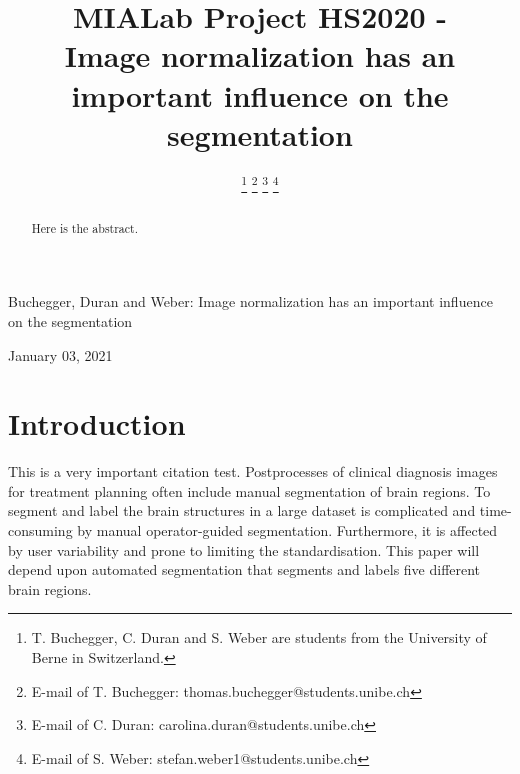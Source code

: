 \documentclass[journal]{IEEEtran}
\begin{document}


\title{MIALab Project HS2020 - \\ Image normalization has an important influence on the segmentation}

\author{ 
\and {} 
\and {} 
\thanks{T. Buchegger, C. Duran and S. Weber are students from the University of Berne in Switzerland.}%
\thanks{E-mail of T. Buchegger: thomas.buchegger@students.unibe.ch}%
\thanks{E-mail of C. Duran: carolina.duran@students.unibe.ch}%
\thanks{E-mail of S. Weber: stefan.weber1@students.unibe.ch}}

%
{Buchegger, Duran and Weber: Image normalization has an important influence on the segmentation}
\maketitle
\newpage



\begin{abstract}
Here is the abstract.


\end{abstract}
\hfill January 03, 2021




\section{Introduction}

	This is a very important citation test. \cite{Roohani2018}	
	Postprocesses of clinical diagnosis images for treatment planning often include manual segmentation of brain regions. 
	To segment and label the brain structures in a large dataset is complicated and time-consuming by manual operator-guided segmentation. 
	Furthermore, it is affected by user variability and prone to limiting the standardisation. 
	This paper will depend upon automated segmentation that segments and labels five different brain regions. \\
\end{document}
